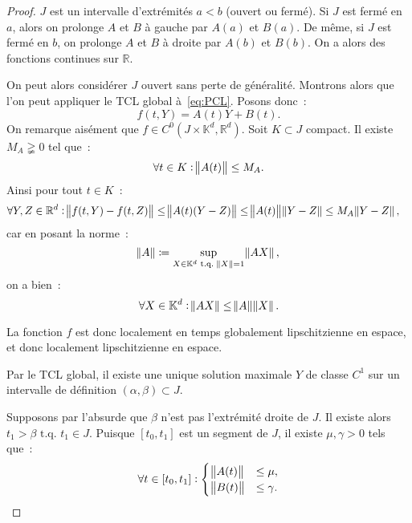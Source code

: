 \documentclass{report}
\theoremstyle{definition}
\theoremstyle{remark}
\numberwithin{equation}{section}
\newcommand{\K}{\mathbb K}
\newcommand{\R}{\mathbb R}
\newcommand{\tq}{\text{ t.q. }}
\begin{document}
			\begin{proof} $J$ est un intervalle d'extrémités $a < b$ (ouvert ou fermé). Si $J$ est fermé en $a$, alors on prolonge $A$ et $B$ à gauche par $A(a)$
			et $B(a)$. De même, si $J$ est fermé en $b$, on prolonge $A$ et $B$ à droite par $A(b)$ et $B(b)$. On a alors des fonctions continues sur $\R$.

			On peut alors considérer $J$ ouvert sans perte de généralité. Montrons alors que l'on peut appliquer le TCL global à~\eqref{eq:PCL}.
			Posons donc~:
			\begin{equation}
				f(t, Y) = A(t)Y + B(t).
			\end{equation}
			On remarque aisément que $f \in C^0(J \times \K^d, \R^d)$. Soit $K \subset J$ compact. Il existe $M_A \gneqq 0$ tel que~:
			\begin{equation}
				\forall t \in K : \norm {A(t)} \leq M_A.
			\end{equation}
			Ainsi pour tout $t \in K$~:
			\begin{align}
				\forall Y, Z \in \R^d : \norm {f(t, Y) - f(t, Z)} &\leq \norm {A(t)(Y-Z)} \leq \norm {A(t)}\norm {Y-Z} \leq M_A\norm{Y-Z},
			\end{align}
			car en posant la norme~:
			\begin{equation}
				\norm A \coloneqq \sup_{X \in \K^d \tq \norm X = 1}\norm {AX},
			\end{equation}
			on a bien~:
			\begin{equation}
				\forall X \in \K^d : \norm {AX} \leq \norm A \norm X.
			\end{equation}

			La fonction $f$ est donc localement en temps globalement lipschitzienne en espace, et donc localement lipschitzienne en espace.

			Par le TCL global, il existe une unique solution maximale $Y$ de classe $C^1$ sur un intervalle de définition $(\alpha, \beta) \subset J$.

			Supposons par l'absurde que $\beta$ n'est pas l'extrémité droite de $J$. Il existe alors $t_1 > \beta \tq t_1 \in J$. Puisque $[t_0, t_1]$ est un
			segment de $J$, il existe $\mu, \gamma > 0$ tels que~:
			\begin{equation}
				\forall t \in [t_0, t_1] : \begin{cases}\norm {A(t)} &\leq \mu, \\\norm {B(t)} &\leq \gamma.\end{cases}
			\end{equation}


\end{proof}
\end{document}
